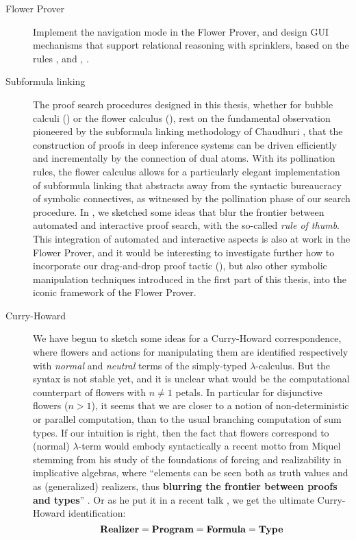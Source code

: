 \begin{procedure}[H]
\begin{description}
  \item[Flower Prover] Implement the navigation mode in the Flower Prover, and
  design GUI mechanisms that support relational reasoning with sprinklers, based
  on the rules ,  and , .

  \item[Subformula linking] The proof search procedures designed in this thesis,
  whether for bubble calculi () or the flower calculus
  (), rest on the fundamental observation pioneered by
  the subformula linking methodology of Chaudhuri , that
  the construction of proofs in deep inference systems can be driven efficiently
  and incrementally by the connection of dual atoms. With its pollination rules,
  the flower calculus allows for a particularly elegant implementation of
  subformula linking that abstracts away from the syntactic bureaucracy of
  symbolic connectives, as witnessed by the pollination phase of our search
  procedure. In , we sketched some ideas that blur the
  frontier between automated and interactive proof search, with the so-called
  \emph{rule of thumb}. This integration of automated and interactive aspects is
  also at work in the Flower Prover, and it would be interesting to investigate
  further how to incorporate our drag-and-drop proof tactic (), but
  also other symbolic manipulation techniques introduced in the first part of
  this thesis, into the iconic framework of the Flower Prover.

  \item[Curry-Howard] We have begun to sketch some ideas for a Curry-Howard
correspondence, where flowers and actions for manipulating them are identified
respectively with \emph{normal} and \emph{neutral} terms of the simply-typed
$\lambda$-calculus. But the syntax is not stable yet, and it is unclear what
would be the computational counterpart of flowers with $n \not= 1$ petals. In
particular for disjunctive flowers ($n > 1$), it seems that we are closer to a
notion of non-deterministic or parallel computation, than to the usual branching
computation of sum types. If our intuition is right, then the fact that flowers
correspond to (normal) $\lambda$-term would embody syntactically a recent motto
from Miquel stemming from his study of the foundations of forcing and
realizability in implicative algebras, where ``elements can be seen both as
truth values and as (generalized) realizers, thus \textbf{blurring the frontier
between proofs and types}'' \cite{miquel_implicative_2020}. Or as he put
it in a recent talk \cite{miquel_implicative_topos_2022}, we get the ultimate
Curry-Howard identification:
$$
\text{\textbf{Realizer}} = \text{\textbf{Program}} = \text{\textbf{Formula}} = \text{\textbf{Type}}
$$
\end{description}


\end{procedure}

